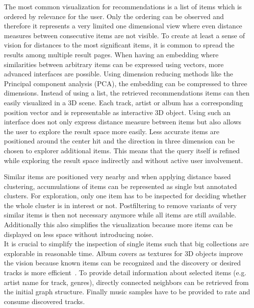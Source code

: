 \documentclass[sigconf]{acmart}
\begin{document}
The most common visualization for recommendations is a list of items which is ordered by relevance for the user. Only the ordering can be observed and therefore it represents a very limited one dimensional view where even distance measures between consecutive items are not visible. To create at least a sense of vision for distances to the most significant items, it is common to spread the results among multiple result pages. 
When having an embedding where similarities between arbitrary items can be expressed using vectors, more advanced interfaces are possible. Using dimension reducing methods like the Principal component analysis (PCA), the embedding can be compressed to three dimensions. Instead of using a list, the retrieved recommendations items can then easily visualized in a 3D scene. Each track, artist or album has a corresponding position vector and is representable as interactive 3D object. Using such an interface does not only express distance measure between items but also allows the user to explore the result space more easily. Less accurate items are positioned around the center hit and the direction in three dimension can be chosen to explorer additional items. This means that the query itself is refined while exploring the result space indirectly and without active user involvement.

Similar items are positioned very nearby and when applying distance based clustering, accumulations of items can be represented as single but annotated clusters. For exploration, only one item has to be inspected for deciding whether the whole cluster is in interest or not. Postfiltering to remove variants of very similar items is then not necessary anymore while all items are still available. Additionally this also simplifies the visualization because more items can be displayed on less space without introducing noise.\\

It is crucial to simplify the inspection of single items such that big collections are explorable in reasonable time. Album covers as textures for 3D objects improve the vision because known items can be recognized and the discovery or desired tracks is more efficient~\cite{libeks2011you}. To provide detail information about selected items (e.g. artist name for track, genres), directly connected neighbors can be retrieved from the initial graph structure. Finally music samples have to be provided to rate and consume discovered tracks. \\
\end{document}
